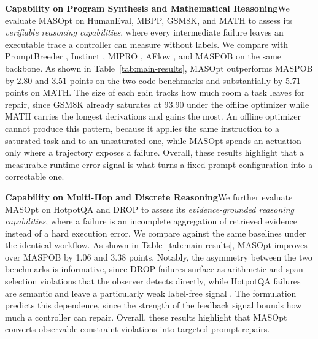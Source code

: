 \documentclass{article}
\theoremstyle{definition}
\begin{document}
\textbf{Capability on Program Synthesis and Mathematical Reasoning}\quad We evaluate MASOpt on HumanEval, MBPP, GSM8K, and MATH to assess its \emph{verifiable reasoning capabilities}, where every intermediate failure leaves an executable trace a controller can measure without labels. We compare with PromptBreeder \citep{fernando2024promptbreeder}, Instinct \citep{lin2023instinct}, MIPRO \citep{opsahlong2024mipro}, AFlow \citep{zhang2024aflow}, and MASPOB \citep{hong2026maspob} on the same backbone. As shown in Table~\ref{tab:main-results}, MASOpt outperforms MASPOB by 2.80 and 3.51 points on the two code benchmarks and substantially by 5.71 points on MATH. The size of each gain tracks how much room a task leaves for repair, since GSM8K already saturates at 93.90 under the offline optimizer while MATH carries the longest derivations and gains the most. An offline optimizer cannot produce this pattern, because it applies the same instruction to a saturated task and to an unsaturated one, while MASOpt spends an actuation only where a trajectory exposes a failure. Overall, these results highlight that a measurable runtime error signal is what turns a fixed prompt configuration into a correctable one.

\textbf{Capability on Multi-Hop and Discrete Reasoning}\quad We further evaluate MASOpt on HotpotQA and DROP to assess its \emph{evidence-grounded reasoning capabilities}, where a failure is an incomplete aggregation of retrieved evidence instead of a hard execution error. We compare against the same baselines under the identical workflow. As shown in Table~\ref{tab:main-results}, MASOpt improves over MASPOB by 1.06 and 3.38 points. Notably, the asymmetry between the two benchmarks is informative, since DROP failures surface as arithmetic and span-selection violations that the observer detects directly, while HotpotQA failures are semantic and leave a particularly weak label-free signal \citep{yang2018hotpotqa,dua2019drop}. The formulation predicts this dependence, since the strength of the feedback signal bounds how much a controller can repair. Overall, these results highlight that MASOpt converts observable constraint violations into targeted prompt repairs.
\end{document}
